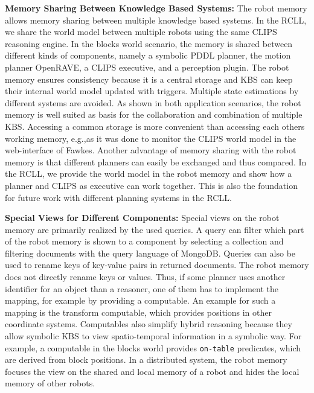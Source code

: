 \textbf{Memory Sharing Between Knowledge Based Systems:}
The robot memory allows memory sharing between multiple knowledge
based systems. In the RCLL, we share the world model between multiple
robots using the same CLIPS reasoning engine. In the blocks world
scenario, the memory is shared between different kinds of components,
namely a symbolic PDDL planner, the motion planner OpenRAVE, a CLIPS
executive, and a perception plugin. The robot memory ensures
consistency because it is a
central storage and KBS can keep their internal world model updated
with triggers. Multiple state estimations by
different systems are avoided.  As shown in both application
scenarios, the robot memory is well suited as basis for the
collaboration and combination of multiple KBS. Accessing a common
storage is more convenient than accessing each others working memory,
e.g.,as it was done to monitor the CLIPS world model in the
web-interface of Fawkes.  Another advantage of memory sharing with the
robot memory is that different planners can easily be exchanged and
thus compared. In the RCLL, we provide the world model in the robot
memory and show how a planner and CLIPS as executive can work
together. This is also the foundation for future work with different
planning systems in the RCLL.

\textbf{Special Views for Different Components:} 
Special views on the robot memory are
primarily realized by the used queries. A query can
filter which part of the robot memory is shown to a component by
selecting a collection and filtering documents with the query language
of MongoDB. Queries can also be used to rename keys of key-value pairs
in returned documents. The robot memory does not directly rename keys
or values. Thus, if some planner uses another identifier for an object
than a reasoner, one of them has to implement the mapping, for example
by providing a computable. An example for such a mapping is
the transform computable, which provides positions in other coordinate
systems. Computables also simplify hybrid reasoning because they allow
symbolic KBS to view spatio-temporal information in a symbolic
way. For example, a computable in the blocks world provides
\texttt{on-table} predicates, which are derived from block positions.
In a distributed system, the robot memory focuses the view on the shared
and local memory of a robot and hides the local memory of other robots. 


